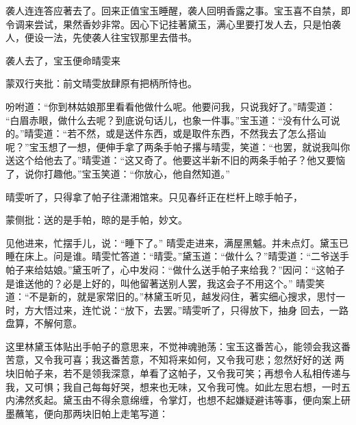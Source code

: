 \begin{parag}
    袭人连连答应著去了。回来正值宝玉睡醒，袭人回明香露之事。宝玉喜不自禁，即令调来尝试，果然香妙非常。因心下记挂著黛玉，满心里要打发人去，只是怕袭人，便设一法，先使袭人往宝钗那里去借书。
\end{parag}


\begin{parag}
    袭人去了，宝玉便命晴雯来\begin{note}蒙双行夹批：前文晴雯放肆原有把柄所恃也。\end{note}吩咐道：“你到林姑娘那里看看他做什么呢。他要问我，只说我好了。”晴雯道： “白眉赤眼，做什么去呢？到底说句话儿，也象一件事。”宝玉道：“没有什么可说的。”晴雯道：“若不然，或是送件东西，或是取件东西，不然我去了怎么搭讪 呢？”宝玉想了一想，便伸手拿了两条手帕子撂与晴雯，笑道：“也罢，就说我叫你送这个给他去了。”晴雯道：“这又奇了。他要这半新不旧的两条手帕子？他又要恼了，说你打趣他。”宝玉笑道：“你放心，他自然知道。”
\end{parag}


\begin{parag}
    晴雯听了，只得拿了帕子往潇湘馆来。只见春纤正在栏杆上晾手帕子，\begin{note}蒙侧批：送的是手帕，晾的是手帕，妙文。\end{note}见他进来，忙摆手儿，说：“睡下了。” 晴雯走进来，满屋黑魆。并未点灯。黛玉已睡在床上。问是谁。晴雯忙答道：“晴雯。”黛玉道：“做什么？”晴雯道：“二爷送手帕子来给姑娘。”黛玉听了，心中发闷：“做什么送手帕子来给我？”因问：“这帕子是谁送他的？必是上好的，叫他留著送别人罢，我这会子不用这个。” 晴雯笑道：“不是新的，就是家常旧的。”林黛玉听见，越发闷住，著实细心搜求，思忖一时，方大悟过来，连忙说：“放下，去罢。”晴雯听了，只得放下，抽身 回去，一路盘算，不解何意。
\end{parag}


\begin{parag}
    这里林黛玉体贴出手帕子的意思来，不觉神魂驰荡：宝玉这番苦心，能领会我这番苦意，又令我可喜；我这番苦意，不知将来如何，又令我可悲；忽然好好的送 两块旧帕子来，若不是领我深意，单看了这帕子，又令我可笑；再想令人私相传递与我，又可惧；我自己每每好哭，想来也无味，又令我可愧。如此左思右想，一时五内沸然炙起。黛玉由不得余意绵缠，令掌灯，也想不起嫌疑避讳等事，便向案上研墨蘸笔，便向那两块旧帕上走笔写道：
\end{parag}


